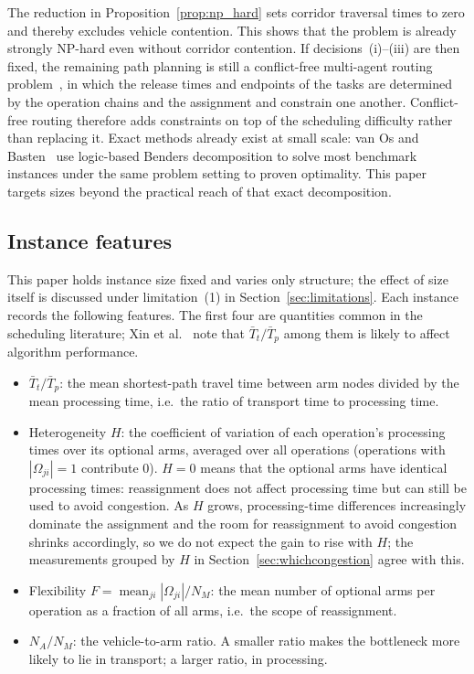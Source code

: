 The reduction in Proposition~\ref{prop:np_hard} sets corridor traversal times to zero and thereby excludes vehicle contention. This shows that the problem is already strongly NP-hard even without corridor contention.
If decisions~(i)--(iii) are then fixed, the remaining path planning is still a conflict-free multi-agent routing problem~\cite{gao2023mapf}, in which the release times and endpoints of the tasks are determined by the operation chains and the assignment and constrain one another.
Conflict-free routing therefore adds constraints on top of the scheduling difficulty rather than replacing it. Exact methods already exist at small scale: van Os and Basten~\cite{vanos2026exact} use logic-based Benders decomposition
to solve most benchmark instances under the same problem setting to proven optimality. This paper targets sizes beyond the practical reach of that exact decomposition.

\subsection{Instance features}
\label{sec:features}

This paper holds instance size fixed and varies only structure; the effect of size itself is discussed under limitation~(1) in Section~\ref{sec:limitations}.
Each instance records the following features. The first four are quantities common in the scheduling literature; Xin et al.~\cite{xin2025review} note that $\bar{T}_t/\bar{T}_p$ among them is likely to affect algorithm performance.


\begin{itemize}[leftmargin=*,topsep=2pt,itemsep=1pt]
  \item $\bar{T}_t/\bar{T}_p$: the mean shortest-path travel time between arm nodes divided by the mean processing time, i.e.\ the ratio of transport time to processing time.
  \item Heterogeneity $H$: the coefficient of variation of each operation's processing times over its optional arms, averaged over all operations (operations with $|\Omega_{ji}|=1$ contribute $0$).
  $H=0$ means that the optional arms have identical processing times: reassignment does not affect processing time but can still be used to avoid congestion.
  As $H$ grows, processing-time differences increasingly dominate the assignment and the room for reassignment to avoid congestion shrinks accordingly, so we do not expect the gain to rise with $H$; the measurements grouped by $H$ in Section~\ref{sec:whichcongestion} agree with this.
  \item Flexibility $F=\operatorname{mean}_{ji}|\Omega_{ji}|/N_M$: the mean number of optional arms per operation as a fraction of all arms, i.e.\ the scope of reassignment.
  \item $N_A/N_M$: the vehicle-to-arm ratio. A smaller ratio makes the bottleneck more likely to lie in transport; a larger ratio, in processing.
\end{itemize}


